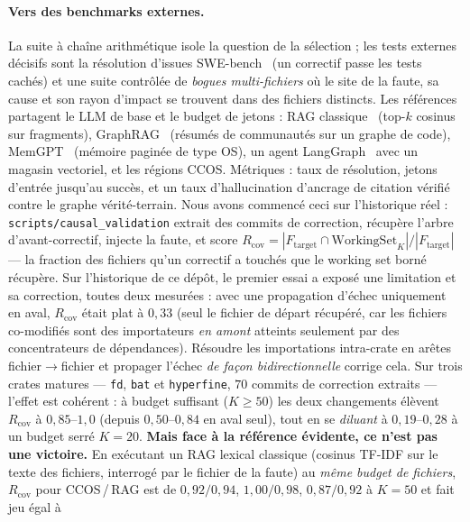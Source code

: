 \documentclass[11pt]{article}
\newcommand{\code}[1]{\texttt{#1}}
\begin{document}
\paragraph{Vers des benchmarks externes.} La suite à chaîne arithmétique isole la
question de la sélection ; les tests externes décisifs sont la résolution d'issues
SWE-bench~\cite{jimenez2023swebench} (un correctif passe les tests cachés) et une suite
contrôlée de \emph{bogues multi-fichiers} où le site de la faute, sa cause et son rayon
d'impact se trouvent dans des fichiers distincts. Les références partagent le LLM de
base et le budget de jetons : RAG classique~\cite{lewis2020rag} (top-$k$ cosinus sur
fragments), GraphRAG~\cite{edge2024graphrag} (résumés de communautés sur un graphe de
code), MemGPT~\cite{packer2023memgpt} (mémoire paginée de type OS), un agent
LangGraph~\cite{langgraph} avec un magasin vectoriel, et les régions CCOS. Métriques :
taux de résolution, jetons d'entrée jusqu'au succès, et un taux d'hallucination
d'ancrage de citation vérifié contre le graphe vérité-terrain. Nous avons commencé ceci
sur l'historique réel : \code{scripts/causal\_validation} extrait des commits de
correction, récupère l'arbre d'avant-correctif, injecte la faute, et score
$R_{\mathrm{cov}} = |F_{\mathrm{target}} \cap \mathrm{WorkingSet}_K| / |F_{\mathrm{target}}|$
--- la fraction des fichiers qu'un correctif a touchés que le working set borné
récupère. Sur l'historique de ce dépôt, le premier essai a exposé une limitation et sa
correction, toutes deux mesurées : avec une propagation d'échec uniquement en aval,
$R_{\mathrm{cov}}$ était plat à $0{,}33$ (seul le fichier de départ récupéré, car les
fichiers co-modifiés sont des importateurs \emph{en amont} atteints seulement par des
concentrateurs de dépendances). Résoudre les importations intra-crate en arêtes
fichier$\to$fichier et propager l'échec \emph{de façon bidirectionnelle} corrige cela.
Sur trois crates matures --- \code{fd}, \code{bat} et \code{hyperfine}, $70$ commits de
correction extraits --- l'effet est cohérent : à budget suffisant ($K{\ge}50$) les deux
changements élèvent $R_{\mathrm{cov}}$ à $0{,}85$--$1{,}0$ (depuis $0{,}50$--$0{,}84$ en
aval seul), tout en se \emph{diluant} à $0{,}19$--$0{,}28$ à un budget serré $K{=}20$.
\textbf{Mais face à la référence évidente, ce n'est pas une victoire.} En exécutant un
RAG lexical classique (cosinus TF-IDF sur le texte des fichiers, interrogé par le
fichier de la faute) au \emph{même budget de fichiers}, $R_{\mathrm{cov}}$ pour CCOS\,/\,RAG
est de $0{,}92/0{,}94$, $1{,}00/0{,}98$, $0{,}87/0{,}92$ à $K{=}50$ et fait jeu égal à
\end{document}
